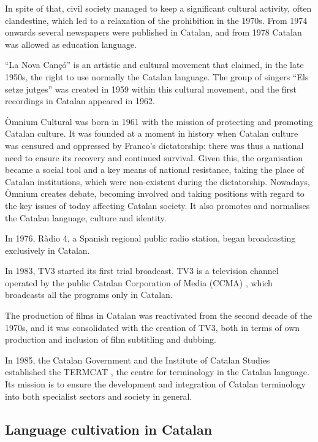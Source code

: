 \begin{multicols}{2}
In spite of that, civil society managed to keep a significant cultural activity, often clandestine, which led to a relaxation of the prohibition in the 1970s. From 1974 onwards several newspapers were published in Catalan, and from 1978 Catalan was allowed as education language.

 “La Nova Cançó” is an artistic and cultural movement that claimed, in the late 1950s, the right to use normally the Catalan language. The group of singers “Els setze jutges” was created in 1959 within this cultural movement, and the first recordings in Catalan appeared in 1962.

Òmnium Cultural \cite{CAT-omniumcultural} was born in 1961 with the mission of protecting and promoting Catalan culture. It was founded at a moment in history when Catalan culture was censured and oppressed by Franco’s dictatorship: there was thus a national need to ensure its recovery and continued survival. Given this, the organisation became a social tool and a key means of national resistance, taking the place of Catalan institutions, which were non-existent during the dictatorship. Nowadays, Òmnium creates debate, becoming involved and taking positions with regard to the key issues of today affecting Catalan society. It also promotes and normalises the Catalan language, culture and identity.

In 1976, Ràdio 4, a Spanish regional public radio station, began broadcasting exclusively in Catalan.

In 1983, TV3 started its first trial broadcast. TV3 is a television channel operated by the public Catalan Corporation of Media (CCMA) \cite{CAT-CCMA}, which broadcasts all the programs only in Catalan.

The production of films in Catalan was reactivated from the second decade of the 1970s, and it was consolidated with the creation of TV3, both in terms of own production and inclusion of film subtitling and dubbing.

In 1985, the Catalan Government and the Institute of Catalan Studies established the TERMCAT \cite{CAT-TERMCAT}, the centre for terminology in the Catalan language. Its mission is to ensure the development and integration of Catalan terminology into both specialist sectors and society in general.

\subsection{Language cultivation in Catalan}


\end{multicols}
